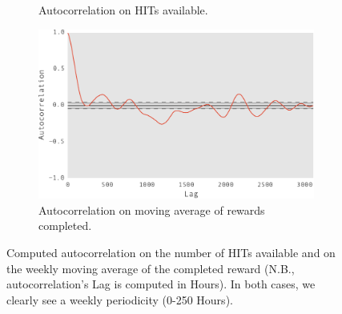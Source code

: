 \begin{figure}[tb]
\begin{subfigure}[b]{0.48\textwidth}
        \caption{Autocorrelation on HITs available.}
        \label{fig:achitav}
    \end{subfigure}
    \hfill
    \begin{subfigure}[b]{0.48\textwidth}
        \centering
        \includegraphics[width=\textwidth]{figures/macac}
        \caption{Autocorrelation on moving average of rewards completed.}
        \label{fig:acmac}
    \end{subfigure}
       
	\caption{Computed autocorrelation on the number of HITs available and on the weekly moving average of the completed reward (N.B., autocorrelation's Lag is computed in Hours). In both cases, we clearly see a weekly periodicity (0-250 Hours).}
	\label{fig:autocorrelation2}
\end{figure}
